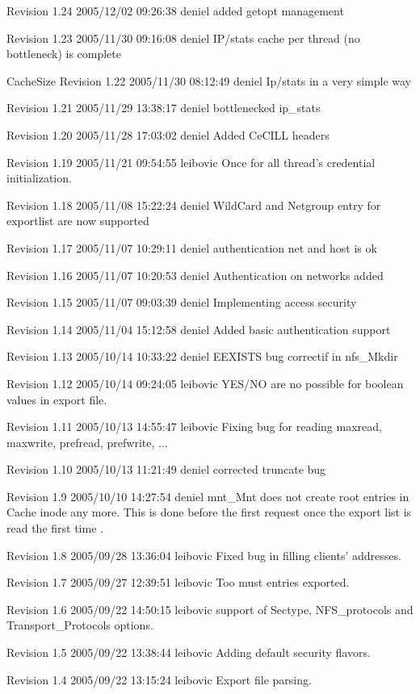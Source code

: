Revision 1.24 2005/12/02 09:26:38 deniel added getopt management

Revision 1.23 2005/11/30 09:16:08 deniel IP/stats cache per thread (no bottleneck) is complete

Cache\-Size Revision 1.22 2005/11/30 08:12:49 deniel Ip/stats in a very simple way

Revision 1.21 2005/11/29 13:38:17 deniel bottlenecked ip\_\-stats

Revision 1.20 2005/11/28 17:03:02 deniel Added Ce\-CILL headers

Revision 1.19 2005/11/21 09:54:55 leibovic Once for all thread's credential initialization.

Revision 1.18 2005/11/08 15:22:24 deniel Wild\-Card and Netgroup entry for exportlist are now supported

Revision 1.17 2005/11/07 10:29:11 deniel authentication net and host is ok

Revision 1.16 2005/11/07 10:20:53 deniel Authentication on networks added

Revision 1.15 2005/11/07 09:03:39 deniel Implementing access security

Revision 1.14 2005/11/04 15:12:58 deniel Added basic authentication support

Revision 1.13 2005/10/14 10:33:22 deniel EEXISTS bug correctif in nfs\_\-Mkdir

Revision 1.12 2005/10/14 09:24:05 leibovic YES/NO are no possible for boolean values in export file.

Revision 1.11 2005/10/13 14:55:47 leibovic Fixing bug for reading maxread, maxwrite, prefread, prefwrite, ...

Revision 1.10 2005/10/13 11:21:49 deniel corrected truncate bug

Revision 1.9 2005/10/10 14:27:54 deniel mnt\_\-Mnt does not create root entries in Cache inode any more. This is done before the first request once the export list is read the first time .

Revision 1.8 2005/09/28 13:36:04 leibovic Fixed bug in filling clients' addresses.

Revision 1.7 2005/09/27 12:39:51 leibovic Too must entries exported.

Revision 1.6 2005/09/22 14:50:15 leibovic support of Sectype, NFS\_\-protocols and Transport\_\-Protocols options.

Revision 1.5 2005/09/22 13:38:44 leibovic Adding default security flavors.

Revision 1.4 2005/09/22 13:15:24 leibovic Export file parsing.

